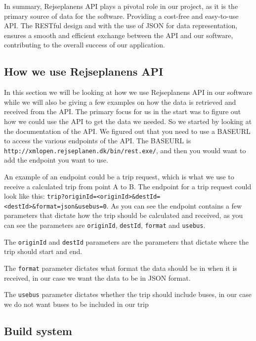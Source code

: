 In summary, Rejseplanens API plays a pivotal role in our project, as it is the primary source of data for the software.
Providing a cost-free and easy-to-use API. The RESTful design and with the use of JSON for data representation, ensures
a smooth and efficient exchange between the API and our software, contributing to the overall success of our
application.

\subsection{How we use Rejseplanens API}\label{subsec:how-we-use-rejseplanens-api}

In this section we will be looking at how we use Rejseplanens API in our software while we will also be giving a few
examples on how the data is retrieved and received from the API\@.
The primary focus for us in the start was to figure out how we could use the API to get the data we needed.
So we started by looking at the documentation of the API\@.
We figured out that you need to use a BASEURL to access the various endpoints of the API\@.
The BASEURL is \lstinline{http://xmlopen.rejseplanen.dk/bin/rest.exe/}, and then you would want to add the endpoint
you want to use.

An example of an endpoint could be a trip request, which is what we use to receive a calculated trip from point A to B.
The endpoint for a trip request could look like this:
\lstinline{trip?originId=<originId>&destId=<destId>&format=json&usebus=0}.
As you can see the endpoint contains a few parameters that dictate how the trip should be calculated and received, as
you can see the parameters are \lstinline{originId}, \lstinline{destId}, \lstinline{format} and \lstinline{usebus}.

The \lstinline{originId} and \lstinline{destId} parameters are the parameters that dictate where the trip should start
and end.

The \lstinline{format} parameter dictates what format the data should be in when it is received, in our case we want
the data to be in JSON format.

The \lstinline{usebus} parameter dictates whether the trip should include buses, in our case we do not want
buses to be included in our trip

\subsection{Build system}\label{subsec:build-system}

